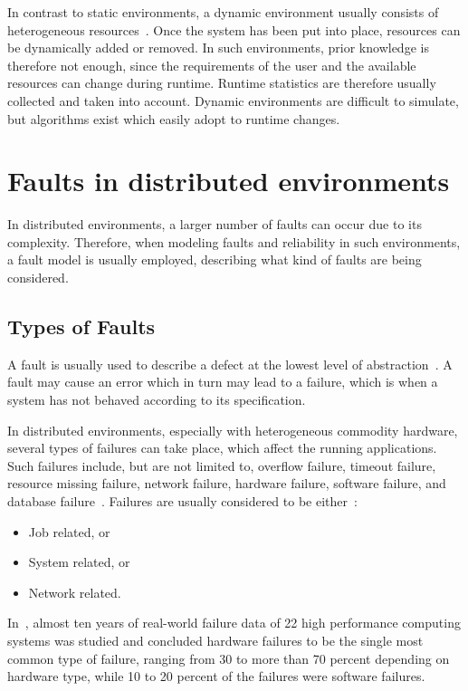 \documentclass{cslthse-msc}
\begin{document}
In contrast to static environments, a dynamic environment usually consists of heterogeneous resources~\cite{compStudyLoadAndCloud}. Once the system has been put into place, resources can be dynamically added or removed. In such environments, prior knowledge is therefore not enough, since the requirements of the user and the available resources can change during runtime. Runtime statistics are therefore usually collected and taken into account. Dynamic environments are difficult to simulate, but algorithms exist which easily adopt to runtime changes. 


\section{Faults in distributed environments} \label{sec:background_faults_distr_env}
In distributed environments, a larger number of faults can occur due to its complexity. Therefore, when modeling faults and reliability in such environments, a fault model is usually employed, describing what kind of faults are being considered.

\subsection{Types of Faults} \label{subsec:background_types_of_faults}
A fault is usually used to describe a defect at the lowest level of abstraction~\cite{faultTolerantFundamentals}. A fault may cause an error which in turn may lead to a failure, which is when a system has not behaved according to its specification.

In distributed environments, especially with heterogeneous commodity hardware, several types of failures can take place, which affect the running applications. Such failures include, but are not limited to, overflow failure, timeout failure, resource missing failure, network failure, hardware failure, software failure, and database failure~\cite{cloudServiceRel}. Failures are usually considered to be either~\cite{evalOfGridRel}:

\begin{itemize}
	\item Job related, or
	\item System related, or
	\item Network related.
\end{itemize}

In~\cite{studyOfFailures}, almost ten years of real-world failure data of 22 high performance computing systems was studied and concluded hardware failures to be the single most common type of failure, ranging from 30 to more than 70 percent depending on hardware type, while 10 to 20 percent of the failures were software failures.
\end{document}
